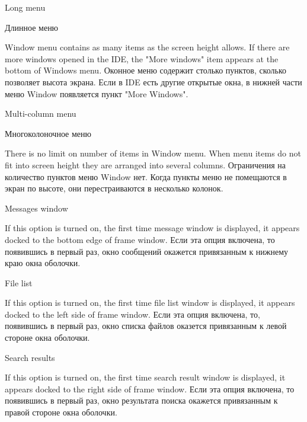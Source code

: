 \begin{popup}
\ifenglish
\caption{Long menu}
 \else
\caption{Длинное меню}
\fi
{}

\ifenglish
Window menu contains as many items as the screen height allows.
If there are more windows opened in the IDE, the "More windows" item
appears at the bottom of Windows menu.
 \else
Оконное меню содержит столько пунктов, сколько позволяет высота экрана.
Если в IDE есть другие открытые окна, в нижней части меню Window появляется
пункт "More Windows".
\fi
\end{popup}

\begin{popup}

\ifenglish
\caption{Multi-column menu}
 \else
\caption{Многоколоночное меню}
\fi
{}

\ifenglish
There is no limit on number of items in Window menu.
When menu items do not fit into screen height they are arranged into several
columns.
 \else
Ограничения на количество пунктов меню Window нет.
Когда пункты меню не помещаются в экран по высоте, они перестраиваются в 
несколько колонок.
\fi
\end{popup}

\begin{popup}
\caption{Messages window}

\ifenglish
If this option is turned on, the first time message window is displayed,
it appears docked to the bottom edge of frame window.
 \else
Если эта опция включена, то появившись в первый раз, окно сообщений окажется
привязанным к нижнему краю окна оболочки.
\fi
\end{popup}

\begin{popup}
\caption{File list}

\ifenglish
If this option is turned on, the first time file list window is displayed,
it appears docked to the left side of frame window.
 \else
Если эта опция включена, то, появившись в первый раз, окно списка файлов 
оказется привязанным к левой стороне окна оболочки. 
\fi
\end{popup}

\begin{popup}
\caption{Search results}

\ifenglish
If this option is turned on, the first time search result window is displayed,
it appears docked to the right side of frame window.
 \else
Если эта опция включена, то появившись в первый раз, окно результата поиска
окажется привязанным к правой стороне окна оболочки.
\fi
\end{popup}

